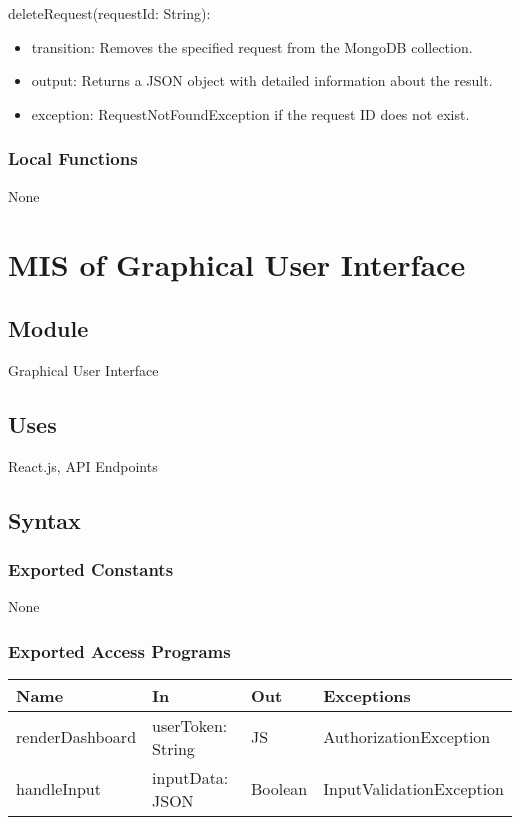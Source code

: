 \documentclass[12pt, titlepage]{article}
\begin{document}
\noindent deleteRequest(requestId: String):
\begin{itemize}
  \item transition: Removes the specified request from the MongoDB collection.
  \item output: Returns a JSON object with detailed information about the result.
  \item exception: RequestNotFoundException if the request ID does not exist.
\end{itemize}

\subsubsection{Local Functions}
None

\section{MIS of Graphical User Interface} \label{Graphical User Interfae}

\subsection{Module}
Graphical User Interface

\subsection{Uses}
React.js, API Endpoints

\subsection{Syntax}

\subsubsection{Exported Constants}
None

\subsubsection{Exported Access Programs}

\begin{center}
\begin{tabular}{p{4cm} p{4cm} p{2cm} p{4cm}}
\hline
\textbf{Name} & \textbf{In} & \textbf{Out} & \textbf{Exceptions} \\
\hline
renderDashboard & userToken: String & JS & AuthorizationException \\
handleInput & inputData: JSON & Boolean & InputValidationException \\
\hline
\end{tabular}
\end{center}
\end{document}
